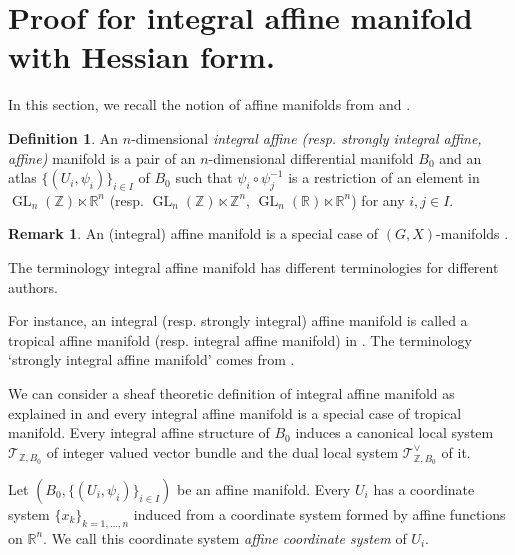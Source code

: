 \documentclass[a4paper,dvipdfmx,reqno,12pt]{amsart}
\theoremstyle{definition}
\newtheorem{definition}[theorem]{Definition}
\newtheorem{remark}[theorem]{Remark}
\newcommand{\opn}[1]{\operatorname{#1}}
\numberwithin{equation}{section}
\begin{document}
\section{Proof for integral affine manifold with Hessian form.}
\label{section-integral-affine-manifold}
In this section,
we recall the notion of affine manifolds from
\cite{MR2293045,
goldmanRadianceObstructionParallel1984a,
MR2181810,
grossMirrorSymmetryLogarithmic2006a} and 
\cite[Chapter 6]{MR2567952}.

\begin{definition} \label{definition-integral-affine-manifold}
An $n$-dimensional \emph{integral affine 
(resp. strongly integral affine, affine)} manifold
is a pair of an $n$-dimensional differential manifold $B_0$ 
and an atlas $\{(U_i,\psi_i)\}_{i \in I}$ of $B_0$ such that 
$\psi_i \circ \psi_j^{-1}$ is a restriction of 
an element in $\opn{GL}_n(\mathbb{Z})\ltimes \mathbb{R}^{n}$
(resp. $\opn{GL}_n(\mathbb{Z})\ltimes \mathbb{Z}^{n}$,
$\opn{GL}_n(\mathbb{R})\ltimes \mathbb{R}^{n}$) for any $i,j\in I$.
\end{definition}

\begin{remark}
An (integral) affine manifold is a special case of 
$(G,X)$-manifolds \cite[3.3]{MR1435975}.

The terminology integral affine manifold has 
different terminologies for different authors. 

For instance, an integral (resp. strongly integral) affine manifold 
is called a tropical affine manifold (resp. integral affine manifold)
in \cite[Definition 1.22]{MR2722115}. 
The terminology `strongly integral affine manifold' 
comes from \cite[Remark 5.10]{MR3079343}.
\end{remark}


We can consider a sheaf theoretic definition of 
integral affine manifold as explained 
in \cite[2.1]{MR2181810} 
and every integral affine manifold is a special case of 
tropical manifold. 
Every integral affine structure of $B_0$ induces a 
canonical local system $\mathcal{T}_{\mathbb{Z},B_0}$ 
of integer valued vector bundle and the dual 
local system $\mathcal{T}_{\mathbb{Z},B_0}^{\vee}$ of it.



Let $(B_0,\{(U_i,\psi_i)\}_{i \in I})$ be an affine manifold.
Every  $U_i$ has a coordinate system $\{x_k\}_{k=1,\ldots,n}$ 
induced from a coordinate system formed 
by affine functions on $\mathbb{R}^{n}$.
We call this coordinate system \emph{affine coordinate system} 
of $U_i$. 
\end{document}
